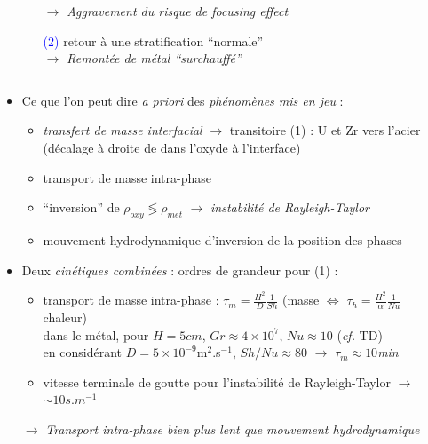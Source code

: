 \begin{frame}
\begin{columns}[T]
\begin{column}{0.55\textwidth}
\begin{minipage}{1.1\textwidth}
\begin{itemize}
\begin{itemize}
\emph{$\rightarrow$ Aggravement du risque de focusing effect}
\item[\textcolor{blue}{(2)}] retour à une stratification ``normale'' \\
\emph{$\rightarrow$ Remontée de métal ``surchauffé''}
\end{itemize}
  \end{itemize}
\end{minipage}
  \end{column}
\end{columns}
      \begin{itemize}
      \item Ce que l'on peut dire \textit{a priori} des \emph{phénomènes mis en jeu} :
      \begin{itemize}
      \item \emph{transfert de masse interfacial} $\rightarrow$ transitoire \textcolor{OliveGreen}{(1)} : U et Zr vers l’acier \\
      {\tiny (décalage à droite de  dans l'oxyde à l’interface)}
      \item transport de masse intra-phase
      \item ``inversion'' de $\rho_{oxy} \lessgtr \rho_{met}$ $\rightarrow$ \emph{instabilité de Rayleigh-Taylor}
      \item mouvement hydrodynamique d'inversion de la position des phases
      \end{itemize}
      \item Deux \emph{cinétiques combinées} : ordres de grandeur pour \textcolor{OliveGreen}{(1)} :
      \begin{itemize}
\item transport de masse intra-phase : $\tau_m = \frac{H^2}{D} \frac{1}{Sh}$ (masse $\Leftrightarrow$ $\tau_h = \frac{H^2}{\alpha} \frac{1}{Nu}$ chaleur) \\
dans le métal, pour $H=5cm$, $Gr\approx4\times 10^{7}$, $Nu\approx10$ (\textit{cf.} TD) \\
en considérant $D=5\times 10^{-9}$m$^2$.s$^{-1}$, $Sh/Nu\approx80$ $\rightarrow$ \emph{$\tau_m \approx 10$min}
\item vitesse terminale de goutte pour l'instabilité de Rayleigh-Taylor $\rightarrow$ \emph{$\sim 10s.m^{-1}$}
      \end{itemize}
      \hskip -0.5cm $\rightarrow$ \emph{Transport intra-phase bien plus lent que mouvement hydrodynamique}
\end{itemize}
    \end{frame}
